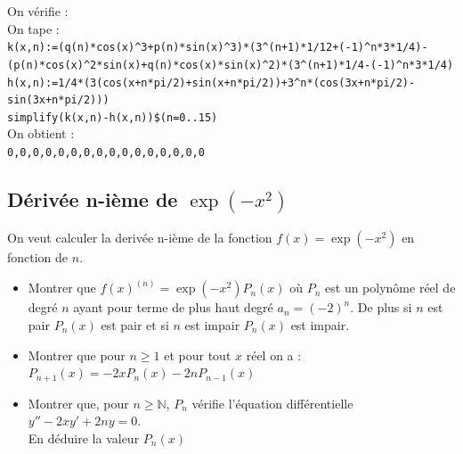\documentclass[a4paper,11pt]{book}
\newcommand{\N}{{\mathbb{N}}}
\begin{document}
On v\'erifie :\\
On tape :\\
{\tt k(x,n):=(q(n)*cos(x)\verb|^|3+p(n)*sin(x)\verb|^|3)*(3\verb|^|(n+1)*1/12+(-1)\verb|^|n*3*1/4)-(p(n)*cos(x)\verb|^|2*sin(x)+q(n)*cos(x)*sin(x)\verb|^|2)*(3\verb|^|(n+1)*1/4-(-1)\verb|^|n*3*1/4)}\\
{\tt h(x,n):=1/4*(3(cos(x+n*pi/2)+sin(x+n*pi/2))+3\verb|^|n*(cos(3x+n*pi/2)-sin(3x+n*pi/2)))}\\ 
{\tt simplify(k(x,n)-h(x,n))\$(n=0..15)}\\ 
On obtient :\\
{\tt 0,0,0,0,0,0,0,0,0,0,0,0,0,0,0,0}
\subsection{D\'eriv\'ee n-i\`eme de $\exp(-x^2)$}
On veut calculer la deriv\'ee n-i\`eme de la fonction $f(x)=\exp(-x^2)$ en 
fonction de $n$.\\
\begin{itemize}
\item Montrer que $f(x)^{(n)}=\exp(-x^2)P_n(x)$ o\`u $P_n$ est un polyn\^ome 
r\'eel de degr\'e $n$ ayant pour terme de plus haut degr\'e $a_n=(-2)^n$.
De plus si $n$ est pair $P_n(x)$ est pair et si $n$ est impair $P_n(x)$ est
impair. 
\item Montrer que pour $n\geq 1$ et pour tout $x$ r\'eel on a :\\
$P_{n+1}(x)=-2xP_n(x)-2nP_{n-1}(x)$
\item Montrer que, pour $n\geq \N$, $P_n$ v\'erifie l'\'equation 
diff\'erentielle  $y''-2xy'+2ny=0$.\\
En d\'eduire la valeur $P_n(x)$
\end{itemize}
\end{document}
